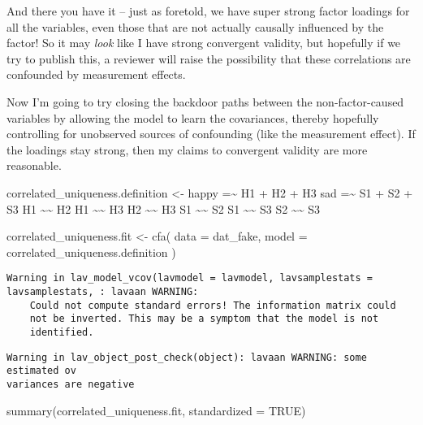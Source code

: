 \documentclass[
  letterpaper,
  DIV=11,
  numbers=noendperiod]{scrreprt}
\newenvironment{Shaded}{\begin{snugshade}}{\end{snugshade}}
\newcommand{\AttributeTok}[1]{\textcolor[rgb]{0.40,0.45,0.13}{#1}}
\newcommand{\ConstantTok}[1]{\textcolor[rgb]{0.56,0.35,0.01}{#1}}
\newcommand{\FunctionTok}[1]{\textcolor[rgb]{0.28,0.35,0.67}{#1}}
\newcommand{\NormalTok}[1]{\textcolor[rgb]{0.00,0.23,0.31}{#1}}
\newcommand{\OtherTok}[1]{\textcolor[rgb]{0.00,0.23,0.31}{#1}}
\newcommand{\StringTok}[1]{\textcolor[rgb]{0.13,0.47,0.30}{#1}}
\begin{document}
And there you have it -- just as foretold, we have super strong factor
loadings for all the variables, even those that are not actually
causally influenced by the factor! So it may \emph{look} like I have
strong convergent validity, but hopefully if we try to publish this, a
reviewer will raise the possibility that these correlations are
confounded by measurement effects.

Now I'm going to try closing the backdoor paths between the
non-factor-caused variables by allowing the model to learn the
covariances, thereby hopefully controlling for unobserved sources of
confounding (like the measurement effect). If the loadings stay strong,
then my claims to convergent validity are more reasonable.

\begin{Shaded}
\begin{Highlighting}[]
\NormalTok{correlated\_uniqueness.definition }\OtherTok{\textless{}{-}} 
  \StringTok{\textquotesingle{}happy =\textasciitilde{} H1 + H2 + H3}
\StringTok{   sad   =\textasciitilde{} S1 + S2 + S3}
\StringTok{   }
\StringTok{   H1 \textasciitilde{}\textasciitilde{} H2}
\StringTok{   H1 \textasciitilde{}\textasciitilde{} H3}
\StringTok{   H2 \textasciitilde{}\textasciitilde{} H3}
\StringTok{   S1 \textasciitilde{}\textasciitilde{} S2}
\StringTok{   S1 \textasciitilde{}\textasciitilde{} S3}
\StringTok{   S2 \textasciitilde{}\textasciitilde{} S3}
\StringTok{   \textquotesingle{}}

\NormalTok{correlated\_uniqueness.fit }\OtherTok{\textless{}{-}} \FunctionTok{cfa}\NormalTok{(}
  \AttributeTok{data =}\NormalTok{ dat\_fake,}
  \AttributeTok{model =}\NormalTok{ correlated\_uniqueness.definition}
\NormalTok{)}
\end{Highlighting}
\end{Shaded}

\begin{verbatim}
Warning in lav_model_vcov(lavmodel = lavmodel, lavsamplestats = lavsamplestats, : lavaan WARNING:
    Could not compute standard errors! The information matrix could
    not be inverted. This may be a symptom that the model is not
    identified.
\end{verbatim}

\begin{verbatim}
Warning in lav_object_post_check(object): lavaan WARNING: some estimated ov
variances are negative
\end{verbatim}

\begin{Shaded}
\begin{Highlighting}[]
\FunctionTok{summary}\NormalTok{(correlated\_uniqueness.fit, }\AttributeTok{standardized =} \ConstantTok{TRUE}\NormalTok{)}
\end{Highlighting}
\end{Shaded}
\end{document}
